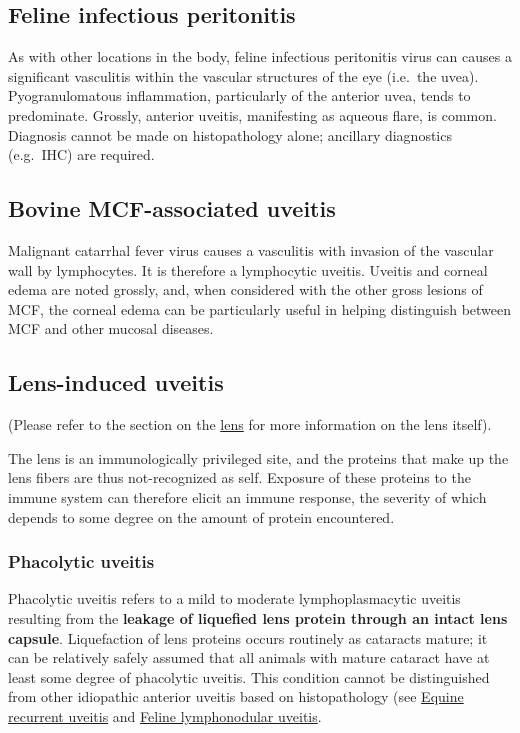 \documentclass[openany]{article}
\begin{document}
\subsection{Feline infectious
peritonitis}\label{feline-infectious-peritonitis}

As with other locations in the body, feline infectious peritonitis virus
can causes a significant vasculitis within the vascular structures of
the eye (i.e.~the uvea). Pyogranulomatous inflammation, particularly of
the anterior uvea, tends to predominate. Grossly, anterior uveitis,
manifesting as aqueous flare, is common. Diagnosis cannot be made on
histopathology alone; ancillary diagnostics (e.g.~IHC) are required.

\subsection{Bovine MCF-associated
uveitis}\label{bovine-mcf-associated-uveitis}

Malignant catarrhal fever virus causes a vasculitis with invasion of the
vascular wall by lymphocytes. It is therefore a lymphocytic uveitis.
Uveitis and corneal edema are noted grossly, and, when considered with
the other gross lesions of MCF, the corneal edema can be particularly
useful in helping distinguish between MCF and other mucosal diseases.

\subsection{Lens-induced uveitis}\label{lens-induced-uveitis}

(Please refer to the section on the
\protect\hyperlink{pathology-of-the-lens}{lens} for more information on
the lens itself).

The lens is an immunologically privileged site, and the proteins that
make up the lens fibers are thus not-recognized as self. Exposure of
these proteins to the immune system can therefore elicit an immune
response, the severity of which depends to some degree on the amount of
protein encountered.

\subsubsection{Phacolytic uveitis}\label{phacolytic-uveitis}

Phacolytic uveitis refers to a mild to moderate lymphoplasmacytic
uveitis resulting from the \textbf{leakage of liquefied lens protein
through an intact lens capsule}. Liquefaction of lens proteins occurs
routinely as cataracts mature; it can be relatively safely assumed that
all animals with mature cataract have at least some degree of phacolytic
uveitis. This condition cannot be distinguished from other idiopathic
anterior uveitis based on histopathology (see
\protect\hyperlink{equine-recurrent-uveitis}{Equine recurrent uveitis}
and \protect\hyperlink{feline-lymphonodular-uveitis}{Feline
lymphonodular uveitis}.
\end{document}
